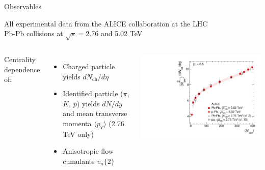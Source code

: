 \documentclass{beamer}
\begin{document}
\begin{frame}{Observables}
  \begin{center}
    All experimental data from the ALICE collaboration at the LHC \\
    Pb-Pb collisions at $\sqrt s = 2.76$ and 5.02 TeV
  \end{center}
  \begin{columns}
    Centrality dependence of: \\[1ex]
    \begin{itemize}
      \setlength{\itemsep}{1.5ex}
      \item Charged particle yields $dN_\text{ch}/d\eta$
      \item Identified particle ($\pi$, $K$, $p$) yields $dN/dy$
        and mean transverse momenta $\langle p_T \rangle$ (2.76 TeV only)
      \item Anisotropic flow cumulants $v_n\{2\}$
    \end{itemize}
    \centering
    \includegraphics[height=.25\textheight]{exptfigs/nch}
    \hfill

\end{columns}
\end{frame}
\end{document}
